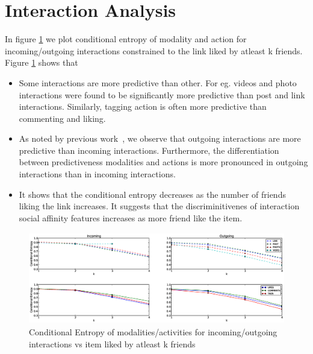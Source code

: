 \section{Interaction Analysis}

In figure \ref{Fig2} we plot conditional entropy of modality and
action for incoming/outgoing interactions constrained to the link
liked by atleast k friends.  Figure \ref{Fig2} shows that
\begin{itemize}
  \item Some interactions are more predictive than other. For
    eg. videos and photo interactions were found to be significantly
    more predictive than post and link interactions. Similarly,
    tagging action is often more predictive than commenting and
    liking.
  \item As noted by previous work~\cite{saez2011high}, we observe that
    outgoing interactions are more predictive than incoming
    interactions. Furthermore, the differentiation between
    predictiveness modalities and actions is more pronounced in
    outgoing interactions than in incoming interactions.
  \item It shows that the conditional entropy decreases as the number
    of friends liking the link increases.  It suggests that the
    discriminitivenes of interaction social affinity features
    increases as more friend like the item.
\end{itemize}


\begin{figure}
\centering
\includegraphics[width=160mm, height=40mm]{data/plots/vsk/ModalityActionsvsKFriends.eps}
\caption{Conditional Entropy  of modalities/activities for incoming/outgoing interactions vs item liked by atleast k friends}
\label{Fig2}
\end{figure}
